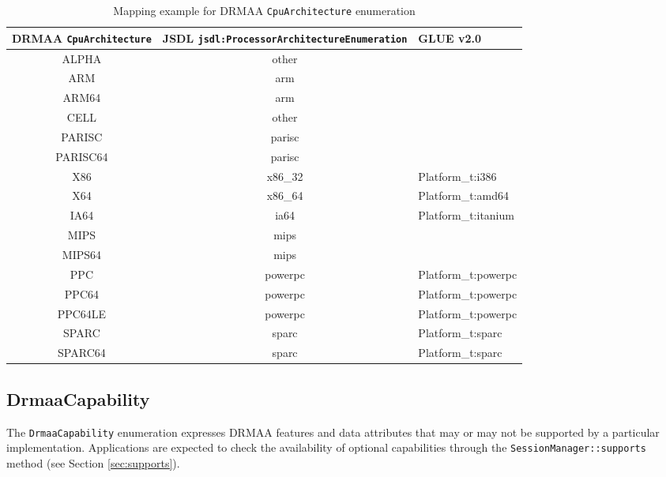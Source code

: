\documentclass{article}
\newcommand{\h}[1]{\lstinline|#1|}
\newcommand{\rat}[1]{}
\begin{document}
\rat{This kind of reporting is the only one that makes sense from the application point of view. The Nov 30th 2011 conf call clarified that CPU speed is intentionally left out in DRMAAv2.}

\begin{table}[ht]
\centering
\begin{tabularx}{\textwidth}{|c|c|X|}
\hline
DRMAA \h{CpuArchitecture} & JSDL \h{jsdl:ProcessorArchitectureEnumeration} & GLUE v2.0 \\
\hline
ALPHA		&	other & \\
ARM			&	arm & \\
ARM64		&	arm & \\
CELL		&	other & \\
PARISC		&	parisc & \\
PARISC64	&	parisc & \\
X86			&	x86\_32 & Platform\_t:i386 \\
X64			&	x86\_64 & Platform\_t:amd64 \\
IA64		&	ia64 & Platform\_t:itanium \\
MIPS		&	mips & \\
MIPS64		&	mips & \\
PPC			&	powerpc & Platform\_t:powerpc \\
PPC64		&	powerpc & Platform\_t:powerpc \\
PPC64LE		&	powerpc & Platform\_t:powerpc \\
SPARC		&	sparc & Platform\_t:sparc \\
SPARC64		&	sparc & Platform\_t:sparc \\
\hline
\end{tabularx}
\caption{Mapping example for DRMAA \h{CpuArchitecture} enumeration}
\label{tab:cpumappings}
\end{table}

\subsection{DrmaaCapability}
\label{sec:drmaacapability}

The \h{DrmaaCapability} enumeration expresses DRMAA features and data attributes that may or may not be supported by a particular implementation. Applications are expected to check the availability of optional capabilities through the \h{SessionManager::supports} method (see Section \ref{sec:supports}).


\end{document}
